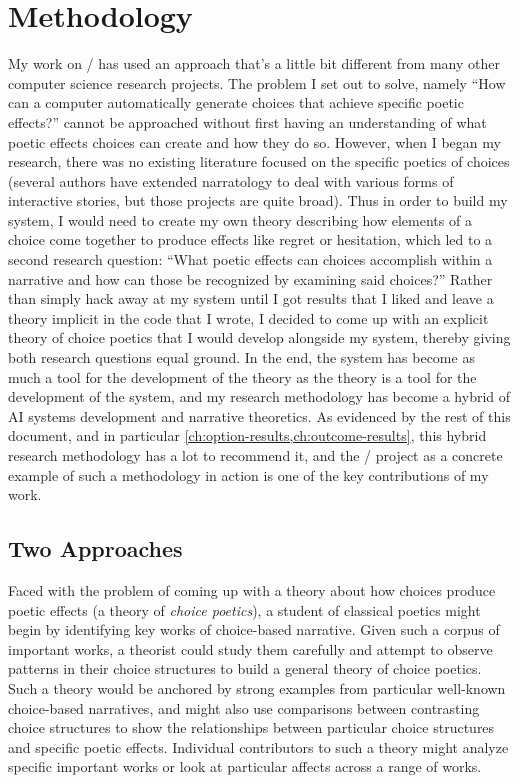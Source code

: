 \chapter{Methodology}

\label{ch:method}

My work on \dunyazad/ has used an approach that's a little bit different from many other computer science research projects.
%
The problem I set out to solve, namely ``How can a computer automatically generate choices that achieve specific poetic effects?'' cannot be approached without first having an understanding of what poetic effects choices can create and how they do so.
%
However, when I began my research, there was no existing literature focused on the specific poetics of choices (several authors have extended narratology to deal with various forms of interactive stories, but those projects are quite broad).
%
Thus in order to build my system, I would need to create my own theory describing how elements of a choice come together to produce effects like regret or hesitation, which led to a second research question: ``What poetic effects can choices accomplish within a narrative and how can those be recognized by examining said choices?''
%
Rather than simply hack away at my system until I got results that I liked and leave a theory implicit in the code that I wrote, I decided to come up with an explicit theory of choice poetics that I would develop alongside my system, thereby giving both research questions equal ground.
%
In the end, the system has become as much a tool for the development of the theory as the theory is a tool for the development of the system, and my research methodology has become a hybrid of AI systems development and narrative theoretics.
%
As evidenced by the rest of this document, and in particular \cref{ch:option-results,ch:outcome-results}, this hybrid research methodology has a lot to recommend it, and the \dunyazad/ project as a concrete example of such a methodology in action is one of the key contributions of my work.


\section{Two Approaches}

Faced with the problem of coming up with a theory about how choices produce poetic effects (a theory of \emph{choice poetics}), a student of classical poetics might begin by identifying key works of choice-based narrative.
%
Given such a corpus of important works, a theorist could study them carefully and attempt to observe patterns in their choice structures to build a general theory of choice poetics.
%
Such a theory would be anchored by strong examples from particular well-known choice-based narratives, and might also use comparisons between contrasting choice structures to show the relationships between particular choice structures and specific poetic effects.
%
Individual contributors to such a theory might analyze specific important works or look at particular affects across a range of works.


